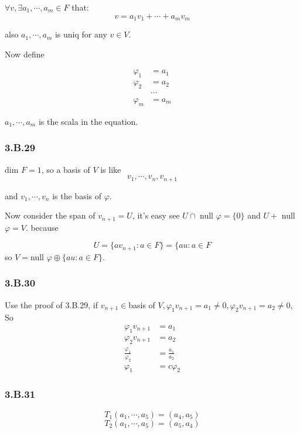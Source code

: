 $\forall v, \exists a_{1},\cdots, a_{m}\in F$ that:
\[v = a_{1}v_{1} + \cdots + a_{m}v_{m}\]

also $a_{1},\cdots,a_{m}$ is uniq for any $v\in V$.

Now define

\begin{equation*}
    \begin{split}
\varphi_{1} &= a_{1} \\
\varphi_{2} &= a_{2} \\
&\cdots \\
\varphi_{m} &= a_{m}
\end{split}
\end{equation*}

$a_{1}, \cdots, a_{m}$ is the scala in the equation.

\subsubsection*{3.B.29}

dim $F = 1$, so a basis of $V$ is like
\[v_{1},\cdots,v_{n}, v_{n+1}\]

and $v_{1},\cdots, v_{n}$ is the basis of $\varphi$. 

Now consider the span of $v_{n+1} = U$, it's easy see $U \cap $ null $\varphi = \{0\}$ and $U + $ null $\varphi = V$. because

\[U = \{av_{n+1}: a\in F\} = \{au: a\in F\]
so $V = $null $\varphi \oplus \{au:a \in F\}$.

\subsubsection*{3.B.30}
Use the proof of 3.B.29, if $v_{n+1}\in $basis of $V,\varphi_{1}v_{n+1} = a_{1} \neq 0, \varphi_{2}v_{n+1} = a_{2} \neq 0$,  So 
\begin{equation*}
    \begin{split}
\varphi_{1}v_{n+1} &= a_{1} \\
\varphi_{2}v_{n+1} &= a_{2} \\
\frac{\varphi_{1}}{\varphi_{2}} & = \frac{a_{1}}{a_{2}} \\
\varphi_{1} &= c\varphi_{2}
\end{split}
\end{equation*}

\subsubsection*{3.B.31}
\[T_{1}(a_{1}, \cdots, a_{5}) = (a_{4}, a_{5})\]
\[T_{2}(a_{1}, \cdots, a_{5}) = (a_{5}, a_{4})\]

